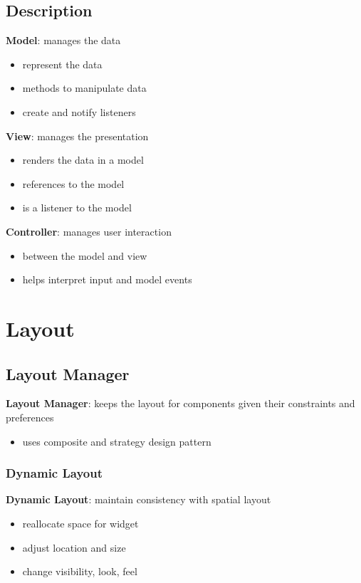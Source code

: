 \documentclass[]{article}
\theoremstyle{definition}
\begin{document}
		\subsection{Description}
			\textbf{Model}: manages the data
			\begin{itemize}
				\item represent the data
				\item methods to manipulate data
				\item create and notify listeners
			\end{itemize}
			\textbf{View}: manages the presentation
			\begin{itemize}
				\item renders the data in a model
				\item references to the model
				\item is a listener to the model
			\end{itemize}
			\textbf{Controller}: manages user interaction
			\begin{itemize}
				\item between the model and view
				\item helps interpret input and model events
			\end{itemize}
	\section{Layout}
		\subsection{Layout Manager}
			\textbf{Layout Manager}: keeps the layout for components given their constraints and preferences
			\begin{itemize}
				\item uses composite and strategy design pattern
			\end{itemize}
			\subsubsection{Dynamic Layout}
				\textbf{Dynamic Layout}: maintain consistency with spatial layout
				\begin{itemize}
					\item reallocate space for widget
					\item adjust location and size
					\item change visibility, look, feel
				\end{itemize}			
\end{document}
